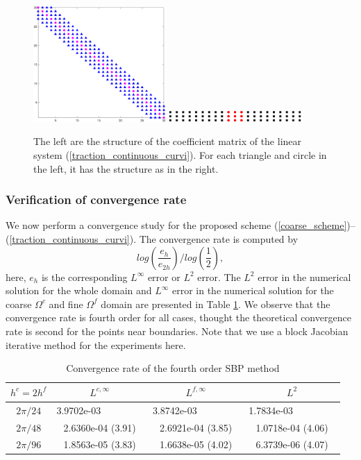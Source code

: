 \documentclass[a4paper]{article}
\begin{document}
\begin{figure}[H]
	\centering
	\includegraphics[width=0.45\textwidth]{Mass_matrix.eps}
	\includegraphics[width=0.45\textwidth]{Mass_block_diagonal.eps}
	\caption{\scriptsize{The left are the structure of the coefficient matrix of the linear system (\ref{traction_continuous_curvi}). For each triangle and circle in the left, it has the structure as in the right.}}\label{Mass_matrix}
\end{figure}

\subsubsection{Verification of convergence rate}\label{convergence_study}
We now perform a convergence study for the proposed scheme (\ref{coarse_scheme})--(\ref{traction_continuous_curvi}). The convergence rate is computed by
\[log\left(\frac{e_h}{e_{2h}}\right)\Bigg/log\left(\frac{1}{2}\right),\]
here, $e_h$ is the corresponding $L^\infty$ error or $L^2$ error.  The $L^2$ error in the numerical solution for the whole domain and $L^\infty$ error in the numerical solution for the coarse $\Omega^c$ and fine $\Omega^f$ domain are presented in Table \ref{convergence_rate}. We observe that the convergence rate is fourth order for all cases, thought the theoretical convergence rate is second for the points near boundaries. Note that we use a block Jacobian iterative method for the experiments here.

\begin{table}[htb]
	\begin{center}
		\begin{tabular}{|c|c c c|}
			\hline
		    $h^c = 2h^f$   & $L^{c,\infty}$ & $L^{f,\infty}$ & $L^2$  \\
			\hline
			$2\pi/24$ &3.9702e-03 ~~~~~~~~ & 3.8742e-03 ~~~~~~~~ & 1.7834e-03 ~~~~~~~~\\
			\hline
			$2\pi/48$ &2.6360e-04 (3.91) & 2.6921e-04 (3.85) & 1.0718e-04 (4.06)\\
			\hline 
			$2\pi/96$ &1.8563e-05 (3.83) & 1.6638e-05 (4.02) & 6.3739e-06 (4.07)\\
			\hline
		\end{tabular}
	\end{center}
  \caption{Convergence rate of the fourth order SBP method}\label{convergence_rate}
\end{table} 
\end{document}

